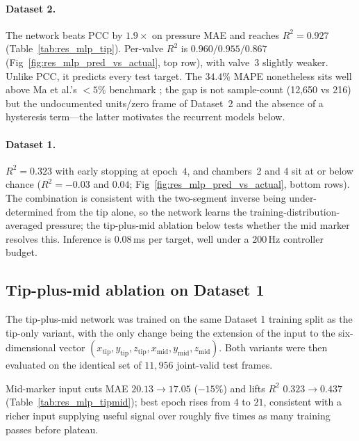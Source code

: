 \paragraph{Dataset 2.}
The network beats PCC by $1.9\times$ on pressure MAE and reaches $R^{2} = 0.927$ (Table~\ref{tab:res_mlp_tip}). Per-valve $R^{2}$ is $0.960 / 0.955 / 0.867$ (Fig~\ref{fig:res_mlp_pred_vs_actual}, top row), with valve~3 slightly weaker. Unlike PCC, it predicts every test target. The $34.4\%$ MAPE nonetheless sits well above Ma et al.'s $<5\%$ benchmark \cite{ma2022bp}; the gap is not sample-count (12{,}650 vs 216) but the undocumented units/zero frame of Dataset~2 and the absence of a hysteresis term---the latter motivates the recurrent models below.

\paragraph{Dataset 1.}
$R^{2} = 0.323$ with early stopping at epoch~$4$, and chambers~2 and 4 sit at or below chance ($R^{2} = -0.03$ and $0.04$; Fig~\ref{fig:res_mlp_pred_vs_actual}, bottom rows). The combination is consistent with the two-segment inverse being under-determined from the tip alone, so the network learns the training-distribution-averaged pressure; the tip-plus-mid ablation below tests whether the mid marker resolves this. Inference is $0.08$\,ms per target, well under a $200$\,Hz controller budget.

\subsection{Tip-plus-mid ablation on Dataset 1}
\label{sec:res_mlp_tipmid}

The tip-plus-mid network was trained on the same Dataset 1 training split as the tip-only variant, with the only change being the extension of the input to the six-dimensional vector $(x_{\mathrm{tip}}, y_{\mathrm{tip}}, z_{\mathrm{tip}}, x_{\mathrm{mid}}, y_{\mathrm{mid}}, z_{\mathrm{mid}})$. Both variants were then evaluated on the identical set of $11{,}956$ joint-valid test frames.

Mid-marker input cuts MAE $20.13 \to 17.05$ ($-15\%$) and lifts $R^{2}$ $0.323 \to 0.437$ (Table~\ref{tab:res_mlp_tipmid}); best epoch rises from $4$ to $21$, consistent with a richer input supplying useful signal over roughly five times as many training passes before plateau.

